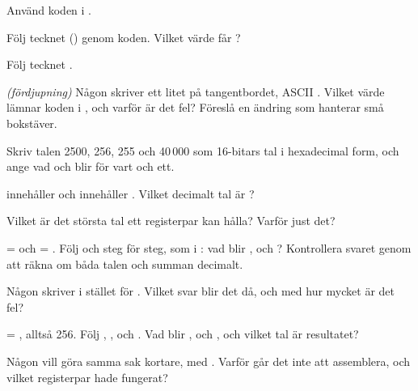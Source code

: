 \label{c10:ex:3}
Använd koden i .
\begin{parts}
  \item Följ tecknet  () genom koden. Vilket värde får ?
  \item Följ tecknet .
  \item \emph{(fördjupning)} Någon skriver ett litet  på tangentbordet, ASCII .
    Vilket värde lämnar koden i , och varför är det fel? Föreslå en ändring som hanterar
    små bokstäver.
\end{parts}

\label{c10:ex:4}
\begin{parts}
  \item Skriv talen 2500, 256, 255 och 40\,000 som 16-bitars tal i hexadecimal form, och ange vad
     och  blir för vart och ett.
  \item {} innehåller  och  innehåller . Vilket decimalt
    tal är ?
  \item Vilket är det största tal ett registerpar kan hålla? Varför just det?
\end{parts}

\label{c10:ex:5}
\begin{parts}
  \item {} =  och  = . Följ
     och  steg för steg, som i : vad blir
    ,  och ? Kontrollera svaret genom att räkna om båda talen och
    summan decimalt.
  \item Någon skriver  i stället för . Vilket svar blir det
    då, och med hur mycket är det fel?
  \item {} = , alltså 256. Följ , ,
     och . Vad blir ,  och , och
    vilket tal är resultatet?
  \item Någon vill göra samma sak kortare, med . Varför går det inte att
    assemblera, och vilket registerpar hade fungerat?
\end{parts}

